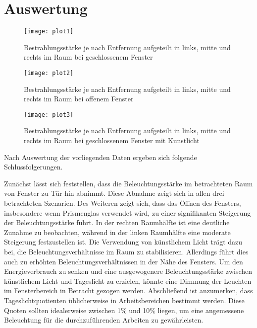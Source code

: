 \section{Auswertung}
\label{sec:Auswertung}
\begin{figure}[ht]
    \centering
    \texttt{[image: plot1]}
    \caption{Bestrahlungsstärke je nach Entfernung aufgeteilt in links, mitte und rechts im Raum bei geschlossenem Fenster}
    \label{fig:plot1_28062023}
  \end{figure}
  \begin{figure}[ht]
    \centering
    \texttt{[image: plot2]}
    \caption{Bestrahlungsstärke je nach Entfernung aufgeteilt in links, mitte und rechts im Raum bei offenem Fenster}
    \label{fig:plot2_28062023}
  \end{figure}
  \begin{figure}[H]
    \centering
    \texttt{[image: plot3]}
    \caption{Bestrahlungsstärke je nach Entfernung aufgeteilt in links, mitte und rechts im Raum bei geschlossenem Fenster mit Kunstlicht}
    \label{fig:plot3_28062023}
  \end{figure}
  Nach Auswertung der vorliegenden Daten ergeben sich folgende Schlussfolgerungen.

Zunächst lässt sich feststellen, dass die Beleuchtungsstärke im betrachteten Raum von Fenster zu Tür hin abnimmt. Diese Abnahme zeigt sich in allen drei betrachteten Szenarien.
Des Weiteren zeigt sich, dass das Öffnen des Fensters, insbesondere wenn Prismenglas verwendet wird, zu einer signifikanten Steigerung der Beleuchtungsstärke führt. In der rechten Raumhälfte ist eine deutliche Zunahme zu beobachten, während in der linken Raumhälfte eine moderate Steigerung festzustellen ist.
Die Verwendung von künstlichem Licht trägt dazu bei, die Beleuchtungsverhältnisse im Raum zu stabilisieren. Allerdings führt dies auch zu erhöhten Beleuchtungsverhältnissen in der Nähe des Fensters. Um den Energieverbrauch zu senken und eine ausgewogenere Beleuchtungsstärke zwischen künstlichem Licht und Tageslicht zu erzielen, könnte eine Dimmung der Leuchten im Fensterbereich in Betracht gezogen werden.
Abschließend ist anzumerken, dass Tageslichtquotienten üblicherweise in Arbeitsbereichen bestimmt werden. Diese Quoten sollten idealerweise zwischen 1\% und 10\% liegen, um eine angemessene Beleuchtung für die durchzuführenden Arbeiten zu gewährleisten.
\newpage
